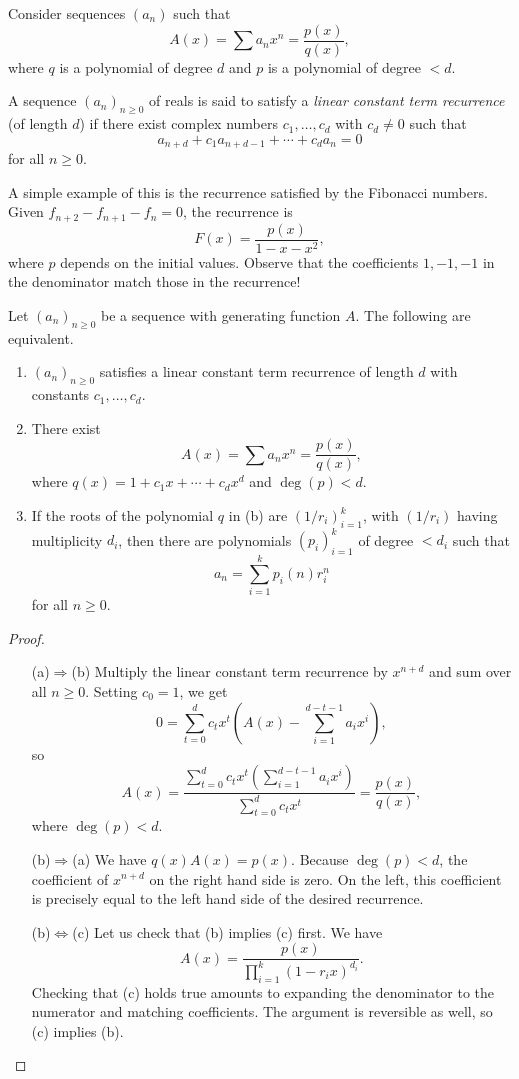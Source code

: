 	Consider sequences $(a_n)$ such that
	\[ A(x) = \sum a_n x^n = \frac{p(x)}{q(x)}, \]
	where $q$ is a polynomial of degree $d$ and $p$ is a polynomial of degree $<d$.	
	\begin{fdef}
		A sequence $(a_n)_{n \ge 0}$ of reals is said to satisfy a \emph{linear constant term recurrence} (of length $d$) if there exist complex numbers $c_1,\ldots,c_d$ with $c_d \ne 0$ such that
		\[ a_{n+d} + c_1 a_{n+d-1} + \cdots + c_d a_n = 0 \]
		for all $n \ge 0$.
	\end{fdef}

	A simple example of this is the recurrence satisfied by the Fibonacci numbers. Given $f_{n+2} - f_{n+1} - f_n = 0$, the recurrence is
	\[ F(x) = \frac{p(x)}{1-x-x^2}, \]
	where $p$ depends on the initial values. Observe that the coefficients $1,-1,-1$ in the denominator match those in the recurrence!

	\begin{ftheo}
		\label{theo: linear const term recurrence}
		Let $(a_n)_{n\ge 0}$ be a sequence with generating function $A$. The following are equivalent.
		\begin{enumerate}[label=(\alph*)]
			\item $(a_n)_{n \ge 0}$ satisfies a linear constant term recurrence of length $d$ with constants $c_1,\ldots,c_d$.
			\item There exist 
			\[ A(x) = \sum a_n x^n = \frac{p(x)}{q(x)}, \]
			where $q(x) = 1 + c_1x + \cdots + c_dx^d$ and $\deg(p) < d$.
			\item If the roots of the polynomial $q$ in (b) are $(1/r_i)_{i=1}^k$, with $(1/r_i)$ having multiplicity $d_i$, then there are polynomials $(p_i)_{i=1}^k$ of degree $<d_i$ such that
			\[ a_n = \sum_{i=1}^k p_i(n) r_i^n \]
			for all $n \ge 0$.
		\end{enumerate}
	\end{ftheo}
	\begin{proof}
		\phantom{pain}
		\begin{itemize}
			\item[(a)$\Rightarrow $(b)] Multiply the linear constant term recurrence by $x^{n+d}$ and sum over all $n \ge 0$. Setting $c_0 = 1$, we get
			\[ 0 = \sum_{t=0}^{d} c_t x^t \left( A(x) - \sum_{i=1}^{d-t-1} a_i x^i \right), \]
			so
			\[ A(x) = \frac{\sum_{t=0}^d c_t x^t \left( \sum_{i=1}^{d-t-1} a_i x^i \right) }{\sum_{t=0}^d c_t x^t} = \frac{p(x)}{q(x)}, \]
			where $\deg(p) < d$.

			\item[(b)$\Rightarrow$(a)] We have $q(x) A(x) = p(x)$. Because $\deg(p) < d$, the coefficient of $x^{n+d}$ on the right hand side is zero. On the left, this coefficient is precisely equal to the left hand side of the desired recurrence.

			\item[(b)$\Leftrightarrow$(c)] Let us check that (b) implies (c) first. We have
			\[ A(x) = \frac{p(x)}{\prod_{i=1}^k (1-r_ix)^{d_i}}. \]
			Checking that (c) holds true amounts to expanding the denominator to the numerator and matching coefficients. The argument is reversible as well, so (c) implies (b). \qedhere
		\end{itemize}
	\end{proof}

